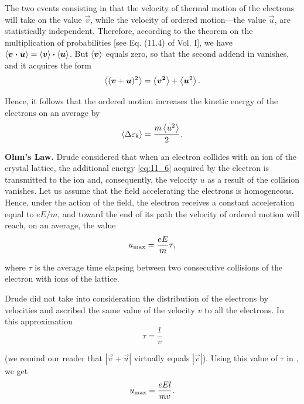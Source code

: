 \noindent
The two events consisting in that the velocity of thermal motion of the electrons will take on the value $\vec{v}$, while the velocity of ordered motion---the value $\vec{u}$, are statistically independent.
Therefore, according to the theorem on the multiplication of probabilities [see Eq. (11.4) of Vol. I], we have $\left\langle \boldsymbol{v\cdot u} \right\rangle = \left\langle \boldsymbol{v} \right\rangle\boldsymbol{\cdot}\left\langle \boldsymbol{u} \right\rangle$.
But $\left\langle \boldsymbol{v} \right\rangle$ equals zero, so that the second addend in  vanishes, and it acquires the form
\begin{equation*}
    \left\langle (\boldsymbol{v}+\boldsymbol{u})^2 \right\rangle = \left\langle \boldsymbol{v^2} \right\rangle + \left\langle \boldsymbol{u}^2 \right\rangle.
\end{equation*}

\noindent
Hence, it follows that the ordered motion increases the kinetic energy of the electrons on an average by
\begin{equation}\label{eq:11_6}
    \left\langle \Delta{\varepsilon_{\text{k}}} \right\rangle = \frac{m\left\langle u^2 \right\rangle}{2}.
\end{equation}

\textbf{Ohm's Law.} Drude considered that when an electron collides with an ion of the crystal lattice, the additional energy \eqref{eq:11_6} acquired by the electron is transmitted to the ion and, consequently, the velocity $u$ as a result of the collision vanishes.
Let us assume that the field accelerating the electrons is homogeneous.
Hence, under the action of the field, the electron receives a constant acceleration equal to $eE/m$, and toward the end of its path the velocity of ordered motion will reach, on an average, the value
\begin{equation}\label{eq:11_7}
    u_{\text{max}} = \frac{eE}{m} \tau,
\end{equation}

\noindent
where $\tau$ is the average time elapsing between two consecutive collisions of the electron with ions of the lattice.

Drude did not take into consideration the distribution of the electrons by velocities and ascribed the same value of the velocity $v$ to all the electrons.
In this approximation
\begin{equation*}
    \tau = \frac{l}{v}
\end{equation*}

\noindent
(we remind our reader that $|\vec{v}+\vec{u}|$ virtually equals $|\vec{v}|$).
Using this value of $\tau$ in , we get
\begin{equation}\label{eq:11_8}
    u_{\text{max}} = \frac{eEl}{mv}.
\end{equation}

